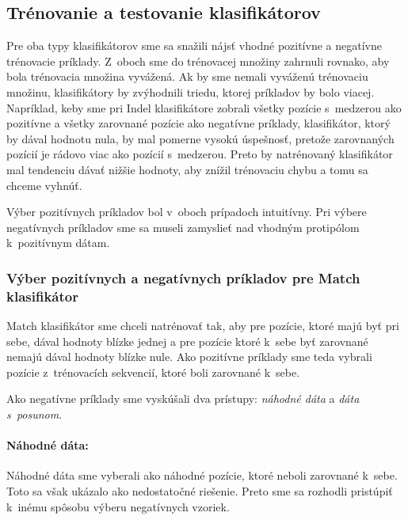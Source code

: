 \subsection{Trénovanie a testovanie klasifikátorov}
\label{subsec:clf-training}
Pre oba typy klasifikátorov sme sa snažili nájsť vhodné pozitívne a negatívne trénovacie príklady. Z~oboch sme do trénovacej množiny zahrnuli rovnako, aby bola trénovacia množina vyvážená. Ak by sme nemali vyváženú trénovaciu množinu, klasifikátory by zvýhodnili triedu, ktorej príkladov by bolo viacej. Napríklad, keby sme pri Indel klasifikátore zobrali všetky pozície s~medzerou ako pozitívne a všetky zarovnané pozície ako negatívne príklady, klasifikátor, ktorý by dával hodnotu nula, by mal pomerne vysokú úspešnosť, pretože zarovnaných pozícií je rádovo viac ako pozícií s~medzerou. Preto by natrénovaný klasifikátor mal tendenciu dávať nižšie hodnoty, aby znížil trénovaciu chybu a tomu sa chceme vyhnúť.

Výber pozitívnych príkladov bol v~oboch prípadoch intuitívny. Pri výbere negatívnych príkladov sme sa museli zamyslieť nad vhodným protipólom k~pozitívnym dátam.

\subsubsection{Výber pozitívnych a negatívnych príkladov pre Match klasifikátor}

Match klasifikátor sme chceli natrénovať tak, aby pre pozície, ktoré majú byť pri sebe, dával hodnoty blízke jednej a pre pozície ktoré k~sebe byť zarovnané nemajú dával hodnoty blízke nule.
Ako pozitívne príklady sme teda vybrali pozície z~trénovacích sekvencií, ktoré boli zarovnané k~sebe.

Ako negatívne príklady sme vyskúšali dva prístupy: \textit{náhodné dáta} a \textit{dáta s~posunom}.

\paragraph{Náhodné dáta:} Náhodné dáta sme vyberali ako náhodné pozície, ktoré neboli zarovnané k~sebe. Toto sa však ukázalo ako nedostatočné riešenie.
Preto sme sa rozhodli pristúpiť k~inému spôsobu výberu negatívnych vzoriek.

